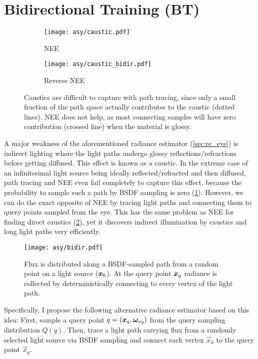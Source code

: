\section{Bidirectional Training (BT)}
\label{sec:re_bidir}
\begin{figure}[htb!]
    \centering
    \begin{subfigure}{0.5\textwidth}
        \centering
        \texttt{[image: asy/caustic.pdf]}
        \caption{NEE}
        \label{fig:caustic_nee}
    \end{subfigure}%
    \begin{subfigure}{0.5\textwidth}
        \centering
        \texttt{[image: asy/caustic\_bidir.pdf]}
        \caption{Reverse NEE}
        \label{fig:caustic_bidir}
    \end{subfigure}
    \caption{Caustics are difficult to capture with path tracing, since only a small fraction of the path space actually contributes to the caustic (dotted lines). NEE does not help, as most connecting samples will have zero contribution (crossed line) when the material is glossy.}
    \label{fig:caustic}
\end{figure}
A major weakness of the aforementioned radiance estimator (\cref{sec:re_eye}) is indirect lighting where the light paths undergo glossy reflections/refractions before getting diffused.
This effect is known as a caustic.
In the extreme case of an infinitesimal light source being ideally reflected/refracted and then diffused, path tracing and NEE even fail completely to capture this effect, because the probability to sample such a path by BSDF sampling is zero (\cref{fig:caustic_nee}). 
However, we can do the exact opposite of NEE by tracing light paths and connecting them to query points sampled from the eye.
This has the same problem as NEE for finding direct caustics (\cref{fig:caustic_bidir}), yet it discovers indirect illumination by caustics and long light paths very efficiently.

\begin{figure}[htb!]
    \centering
    \texttt{[image: asy/bidir.pdf]}
    \caption{Flux is distributed along a BSDF-sampled path from a random point on a light source ($\bm{x}_0$). At the query point $\bm{x}_q$ radiance is collected by deterministically connecting to every vertex of the light path.}
    \label{fig:bidir}
\end{figure}
Specifically, I propose the following alternative radiance estimator based on this idea:
First, sample a query point $q = (\bm{x}_q, {\bm{\omega}_o}_q)$ from the query sampling distribution $Q(q)$.
Then, trace a light path carrying flux from a randomly selected light source via BSDF sampling and connect each vertex $\vec{x}_k$ to the query point $\vec{x}_q$.

